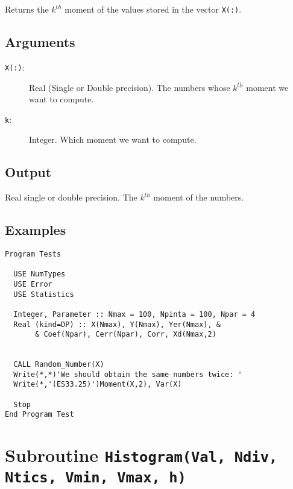 Returns the $k^{\underline{th}}$ moment of the values stored in the
vector \texttt{X(:)}.

\subsection{Arguments}

\begin{description}
\item[\texttt{X(:)}:] Real (Single or Double precision). The numbers
  whose $k^{\underline{th}}$ moment we want to compute.
\item[\texttt{k}:] Integer. Which moment we want to compute.
\end{description}

\subsection{Output}

Real single or double precision. The $k^{\underline{th}}$ moment of
the numbers.

\subsection{Examples}

\begin{lstlisting}[emph=Moment,
                   emphstyle=\color{blue},
                   frame=trBL,
                   caption=Computing the k$^{\text{\underline{th}}}$
                   moment of a data set.,
                   label=moment]
Program Tests

  USE NumTypes
  USE Error
  USE Statistics

  Integer, Parameter :: Nmax = 100, Npinta = 100, Npar = 4
  Real (kind=DP) :: X(Nmax), Y(Nmax), Yer(Nmax), &
       & Coef(Npar), Cerr(Npar), Corr, Xd(Nmax,2)


  CALL Random_Number(X)
  Write(*,*)'We should obtain the same numbers twice: '
  Write(*,'(ES33.25)')Moment(X,2), Var(X)

  Stop
End Program Test
\end{lstlisting}

\section{Subroutine \texttt{Histogram(Val, Ndiv, Ntics, Vmin, Vmax,
    h)}} 

